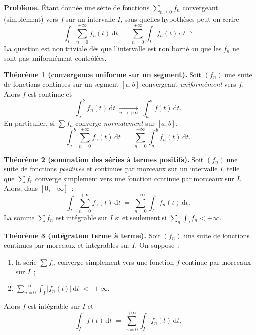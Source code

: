 


\begin{tcolorbox}[thmbox]
  \textbf{Problème.}\enspace%
  Étant donnée une série de fonctions $\sum_{n\geq 0} f_n$ convergeant
  (simplement) vers $f$ sur un intervalle $I$, sous quelles hypothèses
  peut-on écrire
  \[
    \int_I \sum_{n=0}^{+\infty} f_n(t)\,\mathrm{d}t
    \;=\; \sum_{n=0}^{+\infty} \int_I f_n(t)\,\mathrm{d}t\;\;?
  \]
  La question est non triviale dès que l'intervalle est non borné ou que
  les $f_n$ ne sont pas uniformément contrôlées.

  \medskip
  \textbf{Théorème 1 (convergence uniforme sur un segment).}\enspace%
  Soit $(f_n)$ une suite de fonctions continues sur un segment $[a,b]$
  convergeant \emph{uniformément} vers $f$. Alors $f$ est continue et
  \[
    \int_a^b f_n(t)\,\mathrm{d}t \;\xrightarrow[n\to+\infty]{}\;
    \int_a^b f(t)\,\mathrm{d}t.
  \]
  En particulier, si $\sum f_n$ converge \emph{normalement} sur $[a,b]$,
  \[
    \int_a^b \sum_{n=0}^{+\infty} f_n(t)\,\mathrm{d}t
    \;=\; \sum_{n=0}^{+\infty} \int_a^b f_n(t)\,\mathrm{d}t.
  \]

  \medskip
  \textbf{Théorème 2 (sommation des séries à termes positifs).}\enspace%
  Soit $(f_n)$ une suite de fonctions \emph{positives} et continues par
  morceaux sur un intervalle $I$, telle que $\sum f_n$ converge simplement
  vers une fonction continue par morceaux sur $I$. Alors, dans $[0,+\infty]$~:
  \[
    \int_I \sum_{n=0}^{+\infty} f_n(t)\,\mathrm{d}t
    \;=\; \sum_{n=0}^{+\infty} \int_I f_n(t)\,\mathrm{d}t.
  \]
  La somme $\sum f_n$ est intégrable sur $I$ si et seulement si
  $\sum_n \int_I f_n < +\infty$.

  \medskip
  \textbf{Théorème 3 (intégration terme à terme).}\enspace%
  Soit $(f_n)$ une suite de fonctions continues par morceaux et
  intégrables sur $I$. On suppose~:
  \begin{enumerate}
    \item la série $\sum f_n$ converge simplement vers une fonction $f$
          continue par morceaux sur $I$~;
    \item $\displaystyle\sum_{n=0}^{+\infty}\int_I |f_n(t)|\,\mathrm{d}t
          \;<\; +\infty.$
  \end{enumerate}
  Alors $f$ est intégrable sur $I$ et
  \[
    \int_I f(t)\,\mathrm{d}t
    \;=\; \sum_{n=0}^{+\infty} \int_I f_n(t)\,\mathrm{d}t.
  \]
\end{tcolorbox}

